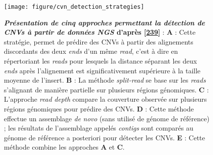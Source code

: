 \documentclass[12pt,a4paper,twoside]{ugathesis}
\theoremstyle{definition}
\theoremstyle{definition}
\theoremstyle{definition}
\theoremstyle{remark}
\begin{document}
\begin{figure}

{\centering \texttt{[image: figure/cvn\_detection\_strategies]} 

}

\caption[Présentation de cinq approches permettant la détection de CNVs à partir de données NGS]{\textbf{\emph{Présentation de cinq approches
permettant la détection de CNVs à partir de données NGS} d'après
{[}\protect\hyperlink{ref-Zhao2013}{239}{]}} : \textbf{A} : Cette
stratégie, permet de prédire des CNVs à partir des alignements
discordants des deux \emph{ends} d'un même \emph{read}, c'est à dire en
répertoriant les \emph{reads} pour lesquels la distance séparant les
deux \emph{ends} après l'alignement est significativement supérieure à
la taille moyenne de l'insert. \textbf{B} : La méthode \emph{split-read}
se base sur les \emph{reads} s'alignant de manière partielle sur
plusieurs régions génomiques. \textbf{C} : L'approche \emph{read depth}
compare la couverture observée sur plusieurs régions génomiques pour
prédire des CNVs. \textbf{D} : Cette méthode effectue un assemblage
\emph{de novo} (sans utilisé de génome de référence) ; les résultats de
l'assemblage appelés \emph{contigs} sont comparés au génome de référence
a posteriori pour détecter les CNVs. \textbf{E} : Cette méthode combine
les approches \textbf{A} et \textbf{C}.}\label{fig:pictcnvdetection}
\end{figure}


















\newpage
\end{document}
